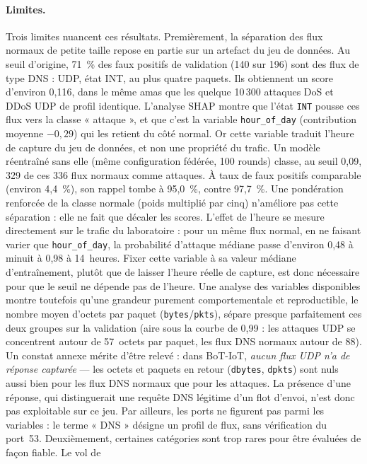 \paragraph{Limites.}
Trois limites nuancent ces résultats. Premièrement, la séparation des flux normaux de petite
taille repose en partie sur un artefact du jeu de données. Au seuil d'origine, 71~\% des faux
positifs de validation (140 sur 196) sont des flux de type DNS : UDP, état INT, au plus quatre
paquets. Ils obtiennent un score d'environ 0,116, dans le même amas que les quelque 10\,300
attaques DoS et DDoS UDP de profil identique. L'analyse SHAP montre que l'état \texttt{INT}
pousse ces flux vers la classe « attaque », et que c'est la variable \texttt{hour\_of\_day}
(contribution moyenne $-0{,}29$) qui les retient du côté normal. Or cette variable traduit l'heure
de capture du jeu de données, et non une propriété du trafic. Un modèle réentraîné sans elle
(même configuration fédérée, 100 rounds) classe, au seuil 0,09, 329 de ces 336 flux normaux comme attaques. À
taux de faux positifs comparable (environ 4,4~\%), son rappel tombe à 95,0~\%, contre 97,7~\%.
Une pondération renforcée de la classe normale (poids multiplié par cinq) n'améliore pas cette
séparation : elle ne fait que décaler les scores. L'effet de l'heure se mesure directement sur le
trafic du laboratoire : pour un même flux normal, en ne faisant varier que \texttt{hour\_of\_day},
la probabilité d'attaque médiane passe d'environ 0,48 à minuit à 0,98 à 14~heures. Fixer cette
variable à sa valeur médiane d'entraînement, plutôt que de laisser l'heure réelle de capture, est
donc nécessaire pour que le seuil ne dépende pas de l'heure. Une analyse des variables disponibles
montre toutefois qu'une grandeur purement comportementale et reproductible, le nombre moyen
d'octets par paquet (\texttt{bytes}/\texttt{pkts}), sépare presque parfaitement ces deux groupes
sur la validation (aire sous la courbe de 0,99 : les attaques UDP se concentrent autour de
57~octets par paquet, les flux DNS normaux autour de 88). Un constat annexe mérite d'être relevé :
dans BoT-IoT, \emph{aucun flux UDP n'a de réponse capturée} --- les octets et paquets en retour
(\texttt{dbytes}, \texttt{dpkts}) sont nuls aussi bien pour les flux DNS normaux que pour les
attaques. La présence d'une réponse, qui distinguerait une requête DNS légitime d'un flot d'envoi,
n'est donc pas exploitable sur ce jeu. Par ailleurs, les ports ne figurent pas parmi les
variables : le terme « DNS » désigne un profil de flux, sans vérification du port~53.
Deuxièmement, certaines catégories sont trop rares pour être évaluées de façon fiable. Le vol de
